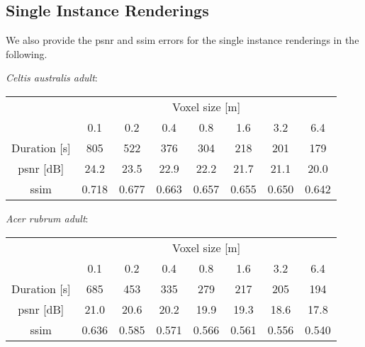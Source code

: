 \subsection{Single Instance Renderings}
We also provide the \ac{psnr} and \ac{ssim} errors for the single instance renderings in the following.

\textit{Celtis australis adult}:
\begin{center}
    \begin{tabular}{| c | c | c | c | c | c | c | c |}
        \cline{2-8}
        \multicolumn{1}{c|}{} & \multicolumn{7}{c|}{Voxel size [m]} \\
        \cline{2-8}
        \multicolumn{1}{c|}{} & 0.1 & 0.2 & 0.4 & 0.8 & 1.6 & 3.2 & 6.4 \\
        \hline
        Duration [s] & 805 & 522 & 376 & 304 & 218 & 201 & 179 \\
        \hline
        \acs{psnr} [dB] & 24.2 & 23.5 & 22.9 & 22.2 & 21.7 & 21.1 & 20.0 \\
        \hline
        \acs{ssim} & 0.718 & 0.677 & 0.663 & 0.657 & 0.655 & 0.650 & 0.642 \\
        \hline
    \end{tabular}
\end{center}

\textit{Acer rubrum adult}:
\begin{center}
    \begin{tabular}{| c | c | c | c | c | c | c | c |}
        \cline{2-8}
        \multicolumn{1}{c|}{} & \multicolumn{7}{c|}{Voxel size [m]} \\
        \cline{2-8}
        \multicolumn{1}{c|}{} & 0.1 & 0.2 & 0.4 & 0.8 & 1.6 & 3.2 & 6.4 \\
        \hline
        Duration [s] & 685 & 453 & 335 & 279 & 217 & 205 & 194 \\
        \hline
        \acs{psnr} [dB] & 21.0 & 20.6 & 20.2 & 19.9 & 19.3 & 18.6 & 17.8 \\
        \hline
        \acs{ssim} & 0.636 & 0.585 & 0.571 & 0.566 & 0.561 & 0.556 & 0.540 \\
        \hline
    \end{tabular}
\end{center}